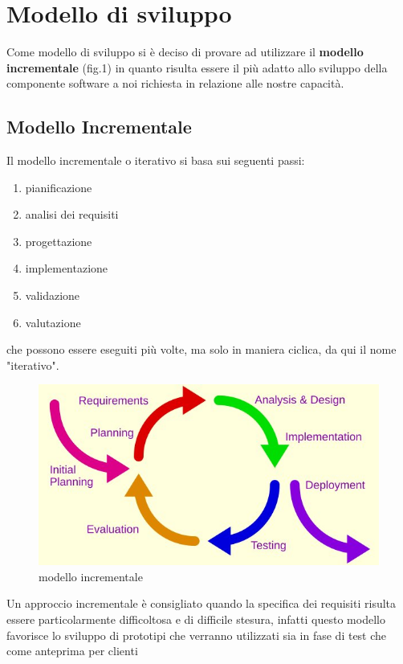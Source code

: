 \section{Modello di sviluppo}
	Come modello di sviluppo si è deciso di provare ad utilizzare il \textbf{modello incrementale} (fig.1) in quanto risulta essere il più adatto allo sviluppo della componente software a noi richiesta in relazione alle nostre capacità. 
	
	\subsection{Modello Incrementale}
		Il modello incrementale o iterativo si basa sui seguenti passi:
		\begin{enumerate}
			\item pianificazione
			\item analisi dei requisiti
			\item progettazione
			\item implementazione
			\item validazione
			\item valutazione
		\end{enumerate}
		che possono essere eseguiti più volte, ma solo in maniera ciclica, da qui il nome "iterativo".
		
		\begin{figure}
			\centering
		    \includegraphics{Iterative_development_model.jpg}
			\caption{modello incrementale}\label{fig:1}
		\end{figure}
		
		Un approccio incrementale è consigliato quando la specifica dei requisiti risulta essere particolarmente difficoltosa e di difficile stesura, infatti questo modello favorisce lo sviluppo di prototipi che verranno utilizzati sia in fase di test che come anteprima per clienti
